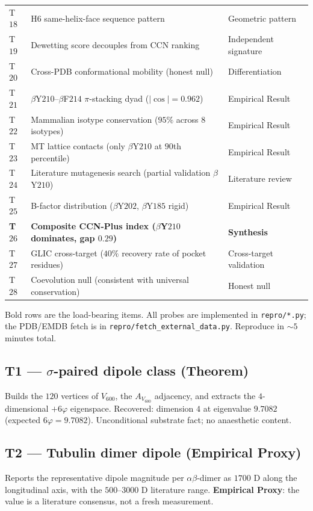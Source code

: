 \documentclass[11pt,a4paper]{article}
\begin{document}
\begin{center}
\begin{tabular}{lll}
T$18$ & H$6$ same-helix-face sequence pattern & Geometric pattern \\
T$19$ & Dewetting score decouples from CCN ranking & Independent signature \\
T$20$ & Cross-PDB conformational mobility (honest null) & Differentiation \\
T$21$ & $\beta$Y$210$--$\beta$F$214$ $\pi$-stacking dyad ($|\cos|=0.962$) & Empirical Result \\
T$22$ & Mammalian isotype conservation ($95\%$ across $8$ isotypes) & Empirical Result \\
T$23$ & MT lattice contacts (only $\beta$Y$210$ at $90$th percentile) & Empirical Result \\
T$24$ & Literature mutagenesis search (partial validation $\beta$Y$210$) & Literature review \\
T$25$ & B-factor distribution ($\beta$Y$202$, $\beta$Y$185$ rigid) & Empirical Result \\
\textbf{T$26$} & \textbf{Composite CCN-Plus index ($\beta$Y$210$ dominates, gap $0.29$)} & \textbf{Synthesis} \\
T$27$ & GLIC cross-target ($40\%$ recovery rate of pocket residues) & Cross-target validation \\
T$28$ & Coevolution null (consistent with universal conservation) & Honest null \\
\bottomrule\end{tabular}
\end{center}

Bold rows are the load-bearing items. All probes are implemented in
\texttt{repro/*.py}; the PDB/EMDB fetch is in
\texttt{repro/fetch\_external\_data.py}. Reproduce in $\sim\!5$
minutes total.

\subsection{\textsf{T1} --- $\sigma$-paired dipole class (Theorem)}
Builds the $120$ vertices of $V_{600}$, the $A_{V_{600}}$ adjacency, and
extracts the $4$-dimensional $+6\varphi$ eigenspace. Recovered:
dimension $4$ at eigenvalue $9.7082$ (expected $6\varphi = 9.7082$).
Unconditional substrate fact; no anaesthetic content.

\subsection{\textsf{T2} --- Tubulin dimer dipole (Empirical Proxy)}
Reports the representative dipole magnitude per $\alpha\beta$-dimer as
$1700$ D along the longitudinal axis, with the $500$--$3000$ D
literature range. \textbf{Empirical Proxy}: the value is a literature
consensus, not a fresh measurement.
\end{document}
